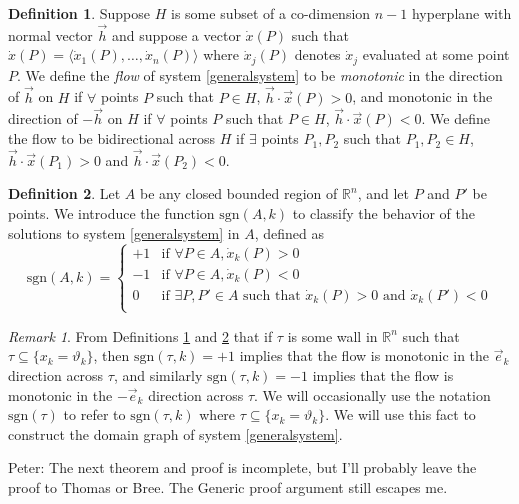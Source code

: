 \documentclass[12pt]{article}
\theoremstyle{definition}
\newtheorem{defn}{Definition}[section]
\theoremstyle{remark}
\newtheorem{remark}{Remark}[section]
\newcommand\sgn{\text{sgn}}
\newcommand{\bbR}{\mathbb{R}} %
\begin{document}
\begin{defn} \label{flowDefn}
Suppose $H$ is some subset of a co-dimension $n-1$ hyperplane with normal vector $\vec{h}$ and suppose a vector $\dot{x}(P)$ such that $\dot{x}(P)=\langle \dot{x}_1(P),\dots,\dot{x}_n(P) \rangle$ where $\dot{x}_j(P)$ denotes $\dot{x}_j$ evaluated at some point $P$. We define the \textit{flow} of system \eqref{generalsystem} to be \textit{monotonic} in the direction of $\vec{h}$ on $H$ if $\forall$ points $P$ such that $P\in H$, $\vec{h}\cdot\vec{x}(P)>0$, and monotonic in the direction of $-\vec{h}$ on $H$ if $\forall$ points $P$ such that $P\in H$, $\vec{h}\cdot\vec{x}(P)<0$. 
We define the flow to be bidirectional across $H$ if $\exists$ points $P_1,P_2$ such that $P_1,P_2 \in H$, $\vec{h}\cdot\vec{x}(P_1)>0$ and $\vec{h}\cdot\vec{x}(P_2)<0$.
\end{defn}

\begin{defn} \label{sgnDefn}
Let $A$ be any closed bounded region of $\bbR^n$, and let $P$ and $P'$ be points.  We introduce the function $\sgn(A,k)$ to classify the behavior of the solutions to system \eqref{generalsystem} in $A$, defined as 
\begin{equation}
\sgn(A,k)=
\begin{cases}
+1	&	\text{if } \forall P\in A, \dot x_k (P)>0\\
-1	&	\text{if } \forall P\in A, \dot x_k (P)<0\\
0	&	\text{if } \exists P,P'\in A \text{ such that }  \dot x_k (P)>0 \text{ and } \dot x_k (P')<0\\
\end{cases}
\end{equation}
\end{defn}

\begin{remark}
From Definitions \ref{flowDefn} and \ref{sgnDefn} that if $\tau$ is some wall in $\mathbb{R}^n$ such that $\tau \subseteq \{x_k=\vartheta_k\}$, then $\sgn(\tau,k)=+1$ implies that the flow is monotonic in the $\vec e_k$ direction across $\tau$, and similarly $\sgn(\tau,k)=-1$ implies that the flow is monotonic in the $-\vec e_k$ direction across $\tau$. We will occasionally use the notation $\sgn(\tau)$ to refer to $\sgn(\tau,k)$ where $\tau \subseteq \{x_k=\vartheta_k\}$. We will use this fact to construct the domain graph of system \eqref{generalsystem}.
\end{remark}

{\color{cyan} Peter: The next theorem and proof is incomplete, but I'll probably leave the proof to Thomas or Bree. The Generic proof argument still escapes me.}
\end{document}
